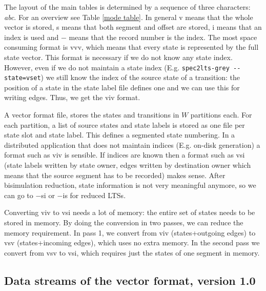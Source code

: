 The layout of the main tables is determined by a sequence of three characters: {\em abc}.
For an overview see Table \ref{mode table}.
In general v means that the whole vector is stored, s means that both segment and offset are stored,
i means that an index is used and ${-}$ means that the record number is
the index. The most space consuming format is vvv, which means that every state is represented by the full state vector.
This format is necessary if we do not know any state index. However, even if we do not maintain a state index (E.g. \verb+spec2lts-grey --state=vset+) we still know the index of the source state of a transition: the position of a state in the state label file defines one
and we can use this for writing edges. Thus, we get the viv format.

A vector format file, stores the states and transitions
in $W$ partitions each. For each partition, a list of source states and state labels is stored
as one file per state slot and state label. This defines a segmented state numbering.
In a distributed application that does not maintain indices (E.g. on-disk generation) a format such as viv is sensible.
If indices are known then a format such as vsi (state labels written by state owner, edges written by destination owner which means that the source
segment has to be recorded) makes sense. After bisimulation reduction, state information is not very meaningful anymore,
so we can go to ${-}$si or ${-}$is for reduced LTSs.

Converting viv to vsi needs a lot of memory: the entire set of states needs to be stored in memory.
By doing the conversion in two passes, we can reduce the memory requirement. In pass 1, we convert
from viv (states+outgoing edges) to vsv (states+incoming edges), which uses no extra memory. In the second pass we convert from
vsv to vsi, which requires just the states of one segment in memory.

\subsection{Data streams of the vector format, version 1.0}

